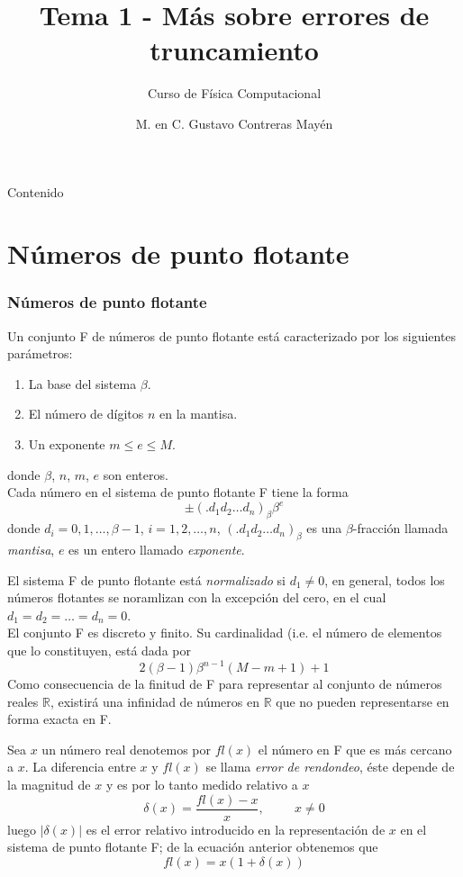 

\title{Tema 1 - Más sobre errores de truncamiento}
\subtitle{Curso de Física Computacional}
\author[]{M. en C. Gustavo Contreras Mayén}
\date{}

\maketitle
\fontsize{14}{14}\selectfont
{}
\begin{frame}{Contenido}
\tableofcontents[pausesections]
\end{frame}
\section{Números de punto flotante}
\begin{frame}
\frametitle{Números de punto flotante}
Un conjunto F de números de punto flotante está caracterizado por los siguientes parámetros:
\begin{enumerate}
\item La base del sistema $\beta$.
\item El número de dígitos $n$ en la mantisa.
\item Un exponente $m \leq e \leq M$.
\end{enumerate}
donde $\beta$, $n$, $m$, $e$ son enteros.
\\
\medskip
Cada número en el sistema de punto flotante F tiene la forma
\[ \pm (.d_{1}d_{2} \ldots d_{n})_{\beta} \beta^{e} \]
donde $d_{i}=0,1,\ldots,\beta-1$, $i=1,2,\ldots,n$, $(.d_{1}d_{2}\ldots d_{n})_{\beta}$ es una  $\beta$-fracción llamada \emph{mantisa}, $e$ es un entero llamado \emph{exponente}. 
\end{frame}
\begin{frame}
El sistema F de punto flotante está \textit{normalizado} si $d_{1} \neq 0$, en general, todos los números flotantes se noramlizan con la excepción del cero, en el cual $d_{1}=d_{2}= \ldots = d_{n} =0$.
\\
\medskip
El conjunto F es discreto y finito. Su cardinalidad (i.e. el número de elementos que lo constituyen, está dada por
\[ 2 (\beta-1) \beta^{n-1} (M-m+1) + 1 \]
Como consecuencia de la finitud de F para representar al conjunto de números reales $\mathbb{R}$, existirá una infinidad de números en $\mathbb{R}$ que no pueden representarse en forma exacta en F.
\end{frame}
\begin{frame}
Sea $x$ un número real denotemos por $fl(x)$ el número en F que es más cercano a $x$. La diferencia entre $x$ y $fl(x)$ se llama \emph{error de rendondeo}, éste depende de la
magnitud de $x$ y es por lo tanto medido relativo a $x$
\[ \delta (x) = \dfrac{fl(x)-x}{x}, \hspace{1cm} x \neq 0\]
luego $\vert \delta (x) \vert$ es el error relativo introducido en la representación de $x$ en el sistema de punto flotante F; de la ecuación anterior obtenemos que
\[ fl(x) = x (1 + \delta(x))\]
\end{frame}
